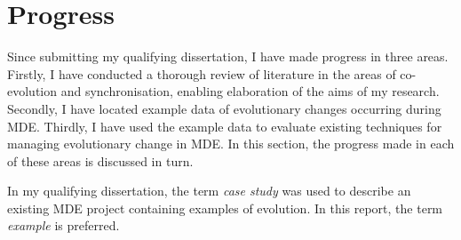 \section{Progress}
Since submitting my qualifying dissertation, I have made progress in three areas. Firstly, I have conducted a thorough review of literature in the areas of co-evolution and synchronisation, enabling elaboration of the aims of my research. Secondly, I have located example data of evolutionary changes occurring during MDE. Thirdly, I have used the example data to evaluate existing techniques for managing evolutionary change in MDE. In this section, the progress made in each of these areas is discussed in turn.

In my qualifying dissertation, the term \emph{case study} was used to describe an existing MDE project containing examples of evolution. In this report, the term \emph{example} is preferred.




